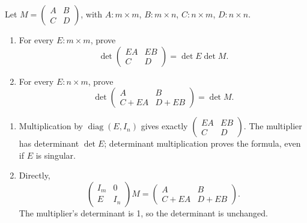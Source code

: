 \begin{problem}\label{ex:05:block-row-operations}
Let \(M=\begin{pmatrix}A&B\\C&D\end{pmatrix}\), with
\(A:m\times m\), \(B:m\times n\), \(C:n\times m\), \(D:n\times n\).
\begin{enumerate}
\item For every \(E:m\times m\), prove
\[
\det\begin{pmatrix}EA&EB\\C&D\end{pmatrix}=\det E\det M.
\]
\item For every \(E:n\times m\), prove
\[
\det\begin{pmatrix}A&B\\C+EA&D+EB\end{pmatrix}=\det M.
\]
\end{enumerate}
\end{problem}
\begin{solution}
\begin{enumerate}
\item Multiplication by \(\operatorname{diag}(E,I_n)\) gives exactly
\(\begin{pmatrix}EA&EB\\C&D\end{pmatrix}\).
The multiplier has determinant \(\det E\); determinant multiplication
proves the formula, even if \(E\) is singular.
\item Directly,
\[
\begin{pmatrix}I_m&0\\E&I_n\end{pmatrix}M
=\begin{pmatrix}A&B\\C+EA&D+EB\end{pmatrix}.
\]
The multiplier's determinant is 1, so the determinant is unchanged.
\end{enumerate}
\end{solution}


